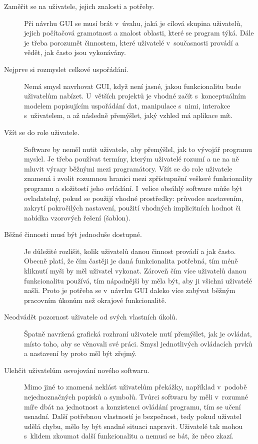 \documentclass[a4paper,12pt,draft]{article}
\begin{document}
\begin{description}
    \item[Zaměřit se na uživatele, jejich znalosti a
    potřeby.] Při návrhu GUI se musí brát v~úvahu, jaká je cílová
    skupina uživatelů, jejich počítačová gramotnost a znalost oblasti,
    které se program týká. Dále je třeba porozumět činnostem,
    které uživatelé v~současnosti provádí a vědět, jak často jsou
    vykonávány.

\item [Nejprve si rozmyslet celkové uspořádání.]
Nemá smysl  navrhovat GUI, když není jasné, jakou funkcionalitu
bude uživatelům nabízet. U~větších projektů je vhodné začít
s~konceptuálním modelem popisujícím uspořádání dat, manipulace s~nimi,
interakce s~uživatelem, a až následně přemýšlet, jaký vzhled má
aplikace mít.

\item [Vžít se do role uživatele.] Software by neměl nutit uživatele,
aby přemýšlel, jak to vývojář programu myslel. Je třeba používat
termíny, kterým uživatelé rozumí a ne na ně mluvit výrazy běžnými
mezi programátory. Vžít se do role uživatele znamená i zvolit rozumnou
hranici mezi zpřístupnění veškeré funkcionality programu a složitostí
jeho ovládání. I~velice obsáhlý software může být ovladatelný,
pokud se použijí vhodné prostředky: průvodce nastavením, zakrytí
pokročilých nastavení, použití vhodných implicitních hodnot či
nabídka vzorových řešení (šablon).

\item [Běžné činnosti musí být jednoduše dostupné.]  Je důležité rozlišit,
 kolik uži\-vatelů danou činnost provádí a jak často. Obecně
platí, že čím častěji je daná funkcionalita potřebná, tím méně
kliknutí myši by měl uživatel vykonat. Zároveň čím více uživatelů
danou funkcionalitu používá, tím nápadnější  by měla být, aby
ji všichni uživatelé našli. Proto je potřeba se v~návrhu GUI  daleko
více zabývat běžným pracovním úkonům než okrajové funkcionalitě.

\item [Neodvádět pozornost uživatele od svých vlastních úkolů.] Špatně
navržená grafická rozhraní uživatele nutí přemýšlet, jak je ovládat,
místo toho, aby se věnovali své práci. Smysl jednotlivých ovládacích
prvků a nastavení by proto měl být zřejmý.

\item [Ulehčit uživatelům osvojování nového softwaru.] Mimo jiné to znamená
ne\-klást uživatelům překážky, například v~podobě nejednoznačných popisků
a symbolů. Tvůrci softwaru by měli v~rozumné míře dbát na jednotnost
a konzistenci ovládání programu, tím se učení usnadní. Další
potřebnou vlastností je bezpečnost, tedy pokud uživatel udělá chybu,
mělo by být snadné situaci napravit. Uživatelé tak mohou s~klidem
zkoumat další funkcionalitu a nemusí se bát, že něco zkazí.


\end{description}
\end{document}
